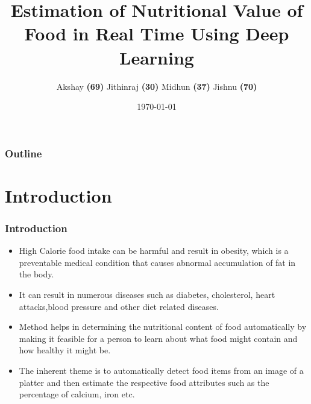 \documentclass{beamer}
\title[Estimation of Nutritional Value of Food]{Estimation of Nutritional Value of Food in Real Time Using Deep Learning} %
\author [Team No. 17]  
{Akshay \textbf{(69)} Jithinraj \textbf{(30)}  Midhun \textbf{(37)}  Jishnu \textbf{(70)}} %
\institute[Dept. of CSE, GCEK] %
{
Guided by: \textbf{Prof. Shine S}  
\bigskip
\\S7 CSE (2016 Batch)\\ %
}
\date{\today} %
\begin{document}
\begin{frame}
\titlepage %
\end{frame}

\begin{frame}
\frametitle{Outline} %
\tableofcontents %
\end{frame}

\section{Introduction} 

\begin{frame}
\frametitle{Introduction}
\begin{itemize}
    \item High Calorie food intake can be harmful and result in obesity,
which is a preventable medical condition that causes abnormal accumulation of fat in the body.
    \item  It can result in numerous diseases such as diabetes, cholesterol, heart attacks,blood pressure and other diet related diseases.
\item Method helps in determining the nutritional content of food automatically by making it feasible for a person to learn about what food might contain and how healthy it might be.
\item The inherent theme is to automatically detect food items from an image of a platter and then estimate the respective food attributes such as the percentage of calcium, iron etc.
\end{itemize}
\end{frame}
\end{document}
